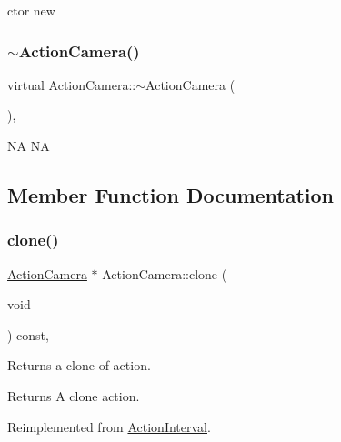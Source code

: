 ctor  new \mbox{\label{classActionCamera_a3db23be122cafb96ae503c086d47bafd}} 
\subsubsection{\texorpdfstring{$\sim$\+Action\+Camera()}{~ActionCamera()}\hspace{0.1cm}{\footnotesize\ttfamily [2/2]}}
{\footnotesize\ttfamily virtual Action\+Camera\+::$\sim$\+Action\+Camera (\begin{DoxyParamCaption}{ }\end{DoxyParamCaption})\hspace{0.3cm}{\ttfamily [inline]}, {\ttfamily [virtual]}}

NA  NA 

\subsection{Member Function Documentation}
\mbox{\label{classActionCamera_a316b7994753b978c45dbe150d6a711e5}} 
\subsubsection{\texorpdfstring{clone()}{clone()}\hspace{0.1cm}{\footnotesize\ttfamily [1/2]}}
{\footnotesize\ttfamily \hyperlink{classActionCamera}{Action\+Camera} $\ast$ Action\+Camera\+::clone (\begin{DoxyParamCaption}\item[{void}]{ }\end{DoxyParamCaption}) const\hspace{0.3cm}{\ttfamily [override]}, {\ttfamily [virtual]}}

Returns a clone of action.

\begin{DoxyReturn}{Returns}
A clone action. 
\end{DoxyReturn}


Reimplemented from \hyperlink{classActionInterval_abc93ce0c2f54a90eb216a7803f25f44a}{Action\+Interval}.



